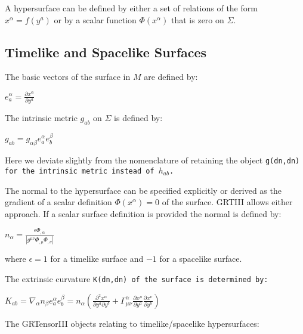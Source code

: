 \documentclass{article}
\begin{document}
A hypersurface can be defined by either a set of relations of the form $x^\alpha = f(y^a)$ or by a scalar function $\Phi(x^\alpha)$ that is zero on 
$\Sigma$.
 

\subsection{Timelike and Spacelike Surfaces}

The basic vectors of the surface in $M$ are defined by:
\begin{center}
$e^{\alpha}_{a} = \frac{\partial x^{\alpha}}{\partial y^a}$
\end{center}


The intrinsic metric $g_{a b}$ on $\Sigma$ is defined by:
\begin{center}
$g_{a b} = g_{\alpha \beta} e^{\alpha}_a e^{\beta}_b$
\end{center}
Here we deviate slightly from the nomenclature of \cite{poisson:2004} retaining the object \text\tt{g(dn,dn)} for the intrinsic metric instead of $h_{a b}$.

The normal to the hypersurface can be specified explicitly or derived as the gradient of a scalar definition $\Phi(x^\alpha) = 0$ of the surface. GRTIII 
allows either approach. If a scalar surface definition is provided the normal is defined by:
\begin{center}
$n_\alpha = \frac{\epsilon \Phi_{,\alpha}}{\left| g^{\mu \nu} \Phi_{,\mu} \Phi_{,\nu} \right|}$
\end{center}
where $\epsilon=1$ for a timelike surface and $-1$ for a spacelike surface.

The extrinsic curvature \text\tt{K(dn,dn)} of the surface is determined by:
\begin{center}
$K_{a b} = \nabla_\alpha n_\beta e^\alpha_a e^\beta_b = n_\alpha \left( \frac{\partial^2 x^\alpha}{\partial y^a \partial y^b}
+ \Gamma^\alpha_{\mu \nu} \frac{\partial x^{\mu}}{\partial y^a} \frac{\partial x^{\nu}}{\partial y^b} \right)$
\end{center}

The GRTensorIII objects relating to timelike/spacelike hypersurfaces:
\end{document}
